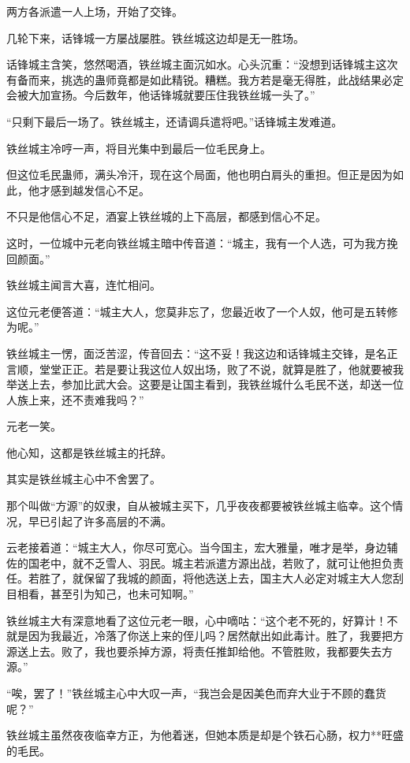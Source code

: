 \begin{this_body}
两方各派遣一人上场，开始了交锋。

几轮下来，话锋城一方屡战屡胜。铁丝城这边却是无一胜场。

话锋城主含笑，悠然喝酒，铁丝城主面沉如水。心头沉重：“没想到话锋城主这次有备而来，挑选的蛊师竟都是如此精锐。糟糕。我方若是毫无得胜，此战结果必定会被大加宣扬。今后数年，他话锋城就要压住我铁丝城一头了。”

“只剩下最后一场了。铁丝城主，还请调兵遣将吧。”话锋城主发难道。

铁丝城主冷哼一声，将目光集中到最后一位毛民身上。

但这位毛民蛊师，满头冷汗，现在这个局面，他也明白肩头的重担。但正是因为如此，他才感到越发信心不足。

不只是他信心不足，酒宴上铁丝城的上下高层，都感到信心不足。

这时，一位城中元老向铁丝城主暗中传音道：“城主，我有一个人选，可为我方挽回颜面。”

铁丝城主闻言大喜，连忙相问。

这位元老便答道：“城主大人，您莫非忘了，您最近收了一个人奴，他可是五转修为呢。”

铁丝城主一愣，面泛苦涩，传音回去：“这不妥！我这边和话锋城主交锋，是名正言顺，堂堂正正。若是要让我这位人奴出场，败了不说，就算是胜了，他就要被我举送上去，参加比武大会。这要是让国主看到，我铁丝城什么毛民不送，却送一位人族上来，还不责难我吗？”

元老一笑。

他心知，这都是铁丝城主的托辞。

其实是铁丝城主心中不舍罢了。

那个叫做“方源”的奴隶，自从被城主买下，几乎夜夜都要被铁丝城主临幸。这个情况，早已引起了许多高层的不满。

云老接着道：“城主大人，你尽可宽心。当今国主，宏大雅量，唯才是举，身边辅佐的国老中，就不乏雪人、羽民。城主若派遣方源出战，若败了，就可让他担负责任。若胜了，就保留了我城的颜面，将他选送上去，国主大人必定对城主大人您刮目相看，甚至引为知己，也未可知啊。”

铁丝城主大有深意地看了这位元老一眼，心中嘀咕：“这个老不死的，好算计！不就是因为我最近，冷落了你送上来的侄儿吗？居然献出如此毒计。胜了，我要把方源送上去。败了，我也要杀掉方源，将责任推卸给他。不管胜败，我都要失去方源。”

“唉，罢了！”铁丝城主心中大叹一声，“我岂会是因美色而弃大业于不顾的蠢货呢？”

铁丝城主虽然夜夜临幸方正，为他着迷，但她本质是却是个铁石心肠，权力**旺盛的毛民。


\end{this_body}
